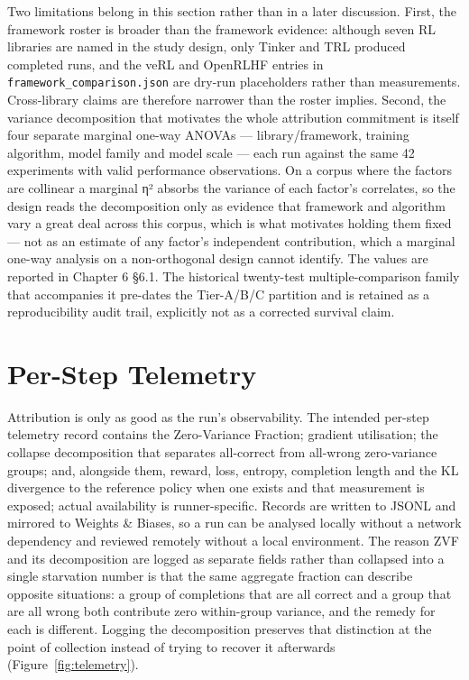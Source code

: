 \documentclass[12pt,a4paper]{report}
\begin{document}
Two limitations belong in this section rather than in a later
discussion. First, the framework roster is broader than the framework
evidence: although seven RL libraries are named in the study design,
only Tinker and TRL produced completed runs, and the veRL and OpenRLHF
entries in \texttt{framework\_comparison.json} are dry-run placeholders
rather than measurements. Cross-library claims are therefore narrower
than the roster implies. Second, the variance decomposition that
motivates the whole attribution commitment is itself four separate
marginal one-way ANOVAs --- library/framework, training algorithm, model
family and model scale --- each run against the same 42 experiments with
valid performance observations. On a corpus where the factors are
collinear a marginal η² absorbs the variance of each factor's
correlates, so the design reads the decomposition only as evidence that
framework and algorithm vary a great deal across this corpus, which is
what motivates holding them fixed --- not as an estimate of any factor's
independent contribution, which a marginal one-way analysis on a
non-orthogonal design cannot identify. The values are reported in
Chapter 6 §6.1. The historical twenty-test multiple-comparison family
that accompanies it pre-dates the Tier-A/B/C partition and is retained
as a reproducibility audit trail, explicitly not as a corrected survival
claim.

\section{Per-Step Telemetry}\label{per-step-telemetry}

Attribution is only as good as the run's observability. The intended
per-step telemetry record contains the Zero-Variance Fraction; gradient
utilisation; the collapse decomposition that separates all-correct from
all-wrong zero-variance groups; and, alongside them, reward, loss,
entropy, completion length and the KL divergence to the reference policy
when one exists and that measurement is exposed; actual availability is
runner-specific. Records are written to JSONL and mirrored to Weights \&
Biases, so a run can be analysed locally without a network dependency
and reviewed remotely without a local environment. The reason ZVF and
its decomposition are logged as separate fields rather than collapsed
into a single starvation number is that the same aggregate fraction can
describe opposite situations: a group of completions that are all
correct and a group that are all wrong both contribute zero within-group
variance, and the remedy for each is different. Logging the
decomposition preserves that distinction at the point of collection
instead of trying to recover it afterwards (Figure~\ref{fig:telemetry}).
\end{document}
